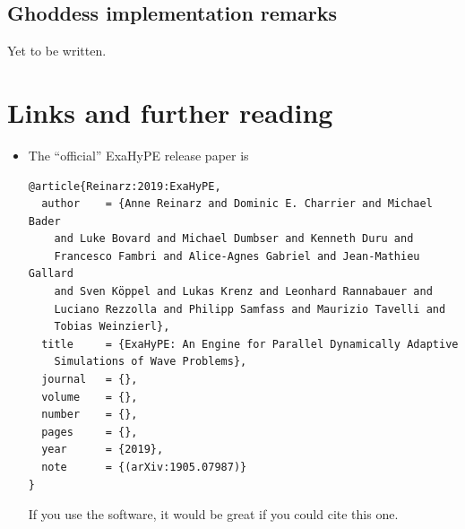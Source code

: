 \subsection{Ghoddess implementation remarks}

\begin{remark}
 Yet to be written.
\end{remark}


\section*{Links and further reading}

\begin{itemize}
  \item The ``official'' ExaHyPE release paper is
  \begin{verbatim}
@article{Reinarz:2019:ExaHyPE,   
  author    = {Anne Reinarz and Dominic E. Charrier and Michael Bader 
    and Luke Bovard and Michael Dumbser and Kenneth Duru and 
    Francesco Fambri and Alice-Agnes Gabriel and Jean-Mathieu Gallard 
    and Sven Köppel and Lukas Krenz and Leonhard Rannabauer and 
    Luciano Rezzolla and Philipp Samfass and Maurizio Tavelli and 
    Tobias Weinzierl}, 
  title     = {ExaHyPE: An Engine for Parallel Dynamically Adaptive 
    Simulations of Wave Problems},   
  journal   = {},
  volume    = {},   
  number    = {},
  pages     = {},
  year      = {2019},   
  note      = {(arXiv:1905.07987)} 
}   
  \end{verbatim}
  If you use the software, it would be great if you could cite this one.
\end{itemize}

